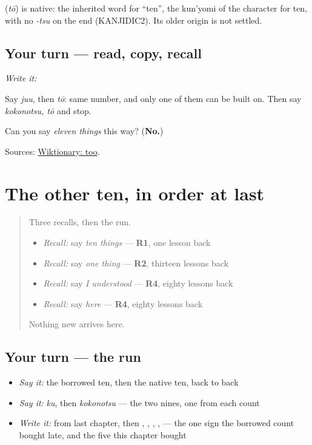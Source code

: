 \begin{cousinweb}
\textbf{} (\emph{tō}) is native: the inherited word for \textquotedblleft{}ten\textquotedblright{}, the kun'yomi of the character for ten, with no \emph{-tsu} on the end (KANJIDIC2). Its older origin is not settled.
\end{cousinweb}

\subsection*{Your turn — read, copy, recall}
\emph{Write it:} \textbf{}

Say \emph{juu}, then \emph{tō}: same number, and only one of them can be built on. Then say \emph{kokonotsu, tō} and stop.

\begin{tcolorbox}[breakable,colback=teal!4,colframe=teal!35!black,title={Before you move on}]
Can you say \emph{eleven things} this way? (\textbf{No.})

Sources: \href{https://en.wiktionary.org/wiki/\%E5\%8D\%81}{Wiktionary: too}.
\end{tcolorbox}
\section[Practice]{The other ten, in order at last}

\label{lesson:JA-R17-the-other-ten}



\begin{quote}
Three recalls, then the run.

\begin{itemize}
\raggedright
  \item \emph{Recall:} say \emph{ten things} — \textbf{R1}, one lesson back
  \item \emph{Recall:} say \emph{one thing} — \textbf{R2}, thirteen lessons back
  \item \emph{Recall:} say \emph{I understood} — \textbf{R4}, eighty lessons back
  \item \emph{Recall:} say \emph{here} — \textbf{R4}, eighty lessons back
\end{itemize}

Nothing new arrives here.
\end{quote}

\subsection*{Your turn — the run}
\begin{itemize}
\raggedright
  \item \emph{Say it:} the borrowed ten, then the native ten, back to back
  \item \emph{Say it:} \emph{ku}, then \emph{kokonotsu} — the two nines, one from each count
  \item \emph{Write it:} \textbf{} from last chapter, then \textbf{}, \textbf{}, \textbf{}, \textbf{}, \textbf{} — the one sign the borrowed count bought late, and the five this chapter bought
\end{itemize}

